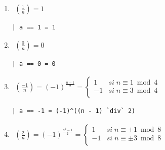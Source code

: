 \documentclass[10pt,spanish]{article}
\begin{document}
\begin{enumerate}[1.]
\begin{verbatim}
| otherwise = exponential_zn a ((n-1) `div` 2) n
\end{verbatim}

\item
\begin{equation*}
    \begin{aligned}
    \left( \frac{1}{n} \right) = 1
    \end{aligned}
    \phantom{\hspace{18cm}}
\end{equation*}

\begin{verbatim}
| a == 1 = 1
\end{verbatim}

\item
\begin{equation*}
    \begin{aligned}
    \left( \frac{0}{n} \right) = 0
    \end{aligned}
    \phantom{\hspace{18cm}}
\end{equation*}

\begin{verbatim}
| a == 0 = 0
\end{verbatim}

\item
\begin{equation*}
    \begin{aligned}
    \left( \frac{-1}{n} \right) = (-1)^{\frac{n-1}{2}} = \begin{cases}
        1 & si \;n \equiv 1 \bmod 4 \\
        -1 & si \;n \equiv 3 \bmod 4\\
        \end{cases}
    \end{aligned}
    \phantom{\hspace{18cm}}
\end{equation*}

\begin{verbatim}
| a == -1 = (-1)^((n - 1) `div` 2)
\end{verbatim}

\item
\begin{equation*}
    \begin{aligned}
    \left( \frac{2}{n} \right) = (-1)^{\frac{n^2-1}{2}} = \begin{cases}
        1 & si \;n \equiv \pm 1 \bmod 8 \\
        -1 & si \;n \equiv \pm 3 \bmod 8\\
        \end{cases}
    \end{aligned}
    \phantom{\hspace{18cm}}
\end{equation*}


\end{enumerate}
\end{document}
